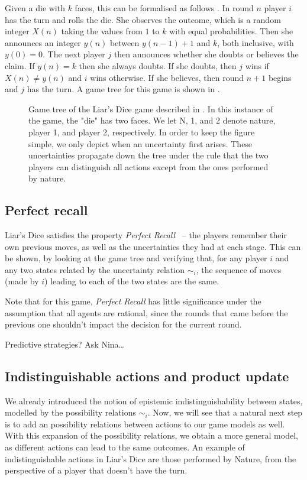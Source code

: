 Given a die with $ k $ faces, this can be formalised as follows \cite{ferguson1991}. In round $n$ player $i$ has the turn and rolls the die. She observes the outcome, which is a random integer $X(n)$ taking the values from $ 1 $ to $ k $ with equal probabilities. Then she announces an integer $y(n)$ between $y(n-1)+1$ and $ k $, both inclusive, with $y(0) = 0$. The next player $j$ then announces whether she doubts or believes the claim. If $y(n)=k$ then she always doubts. If she doubts, then $j$ wins if $X(n) \neq y(n)$ and $i$ wins otherwise. If she believes, then round $n+1$ begins and $j$ has the turn. A game tree for this game is shown in .

\begin{figure}[htbp]
\centering

\caption{Game tree of the Liar's Dice game described in . In this instance of the game, the "die" has two faces. We let N, 1, and 2 denote nature, player 1, and player 2, respectively. In order to keep the figure simple, we only depict when an uncertainty first arises. These uncertainties propagate down the tree under the rule that the two players can distinguish all actions except from the ones performed by nature.}
\label{fig:liars-dice-tree}
\end{figure}


\subsection{Perfect recall}
Liar's Dice satisfies the property \emph{Perfect Recall}~\cite{benthem2001a} -- the players remember their own previous moves, as well as the uncertainties they had at each stage. This can be shown, by looking at the game tree and verifying that, for any player $i$ and any two states related by the uncertainty relation $\sim_i$, the sequence of moves (made by $i$) leading to each of the two states are the same. 

Note that for this game, \emph{Perfect Recall} has little significance under the assumption that all agents are rational, since the rounds that came before the previous one shouldn't impact the decision for the current round.

{ \color{red} Predictive strategies? Ask Nina\dots }

\subsection{Indistinguishable actions and product update}
We already introduced the notion of epistemic indistinguishability between states, modelled by the possibility relations $\sim_i$. Now, we will see that a natural next step is to add an possibility relations between actions to our game models as well. With this expansion of the possibility relations, we obtain a more general model, as different actions can lead to the same outcomes. An example of indistinguishable actions in Liar's Dice are those performed by Nature, from the perspective of a player that doesn't have the turn.

